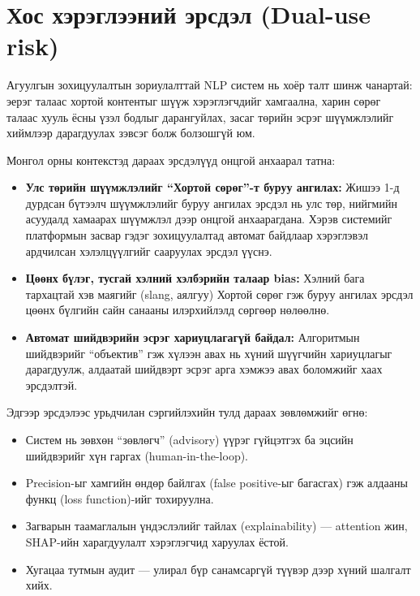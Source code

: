 \section{Хос хэрэглээний эрсдэл (Dual-use risk)}

Агуулгын зохицуулалтын зориулалттай NLP систем нь хоёр талт шинж чанартай:
эерэг талаас хортой контентыг шүүж хэрэглэгчдийг хамгаална, харин сөрөг
талаас хууль ёсны үзэл бодлыг дарангуйлах, засаг төрийн эсрэг шүүмжлэлийг
хиймлээр дарагдуулах зэвсэг болж болзошгүй юм.

Монгол орны контекстэд дараах эрсдэлүүд онцгой анхаарал татна:

\begin{itemize}
  \item \textbf{Улс төрийн шүүмжлэлийг ``Хортой сөрөг''-т буруу ангилах:} Жишээ 1-д
    дурдсан бүтээлч шүүмжлэлийг буруу ангилах эрсдэл нь улс төр, нийгмийн
    асуудалд хамаарах шүүмжлэл дээр онцгой анхаарагдана. Хэрэв системийг
    платформын засвар гэдэг зохицуулалтад автомат байдлаар хэрэглэвэл
    ардчилсан хэлэлцүүлгийг сааруулах эрсдэл үүснэ.
  \item \textbf{Цөөнх бүлэг, тусгай хэлний хэлбэрийн талаар bias:} Хэлний
    бага тархацтай хэв маягийг (slang, аялгуу) Хортой сөрөг гэж буруу ангилах
    эрсдэл цөөнх бүлгийн сайн санааны илэрхийлэлд сөргөөр нөлөөлнө.
  \item \textbf{Автомат шийдвэрийн эсрэг хариуцлагагүй байдал:} Алгоритмын
    шийдвэрийг ``объектив'' гэж хүлээн авах нь хүний шүүгчийн хариуцлагыг
    дарагдуулж, алдаатай шийдвэрт эсрэг арга хэмжээ авах боломжийг
    хаах эрсдэлтэй.
\end{itemize}

Эдгээр эрсдэлээс урьдчилан сэргийлэхийн тулд дараах зөвлөмжийг өгнө:

\begin{itemize}
  \item Систем нь зөвхөн ``зөвлөгч'' (advisory) үүрэг гүйцэтгэх ба эцсийн
    шийдвэрийг хүн гаргах (human-in-the-loop).
  \item Precision-ыг хамгийн өндөр байлгах (false positive-ыг багасгах) гэж
    алдааны функц (loss function)-ийг тохируулна.
  \item Загварын таамаглалын үндэслэлийг тайлах (explainability) --- attention
    жин, SHAP-ийн харагдуулалт хэрэглэгчид харуулах ёстой.
  \item Хугацаа тутмын аудит --- улирал бүр санамсаргүй түүвэр дээр хүний
    шалгалт хийх.
\end{itemize}

